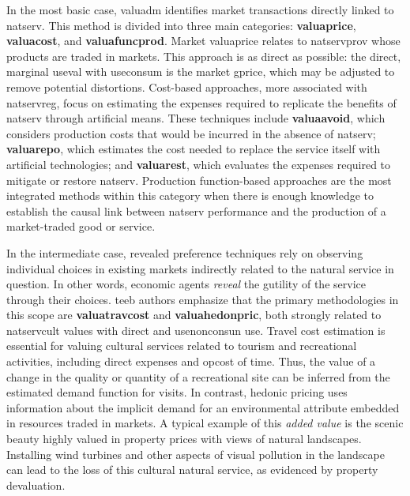 \documentclass[./main_en.tex]{subfiles}
\begin{document}
\par In the most basic case, \gls{valuadm} identifies market transactions directly linked to \gls{natserv}. This method is divided into three main categories: \textbf{\gls{valuaprice}}, \textbf{\gls{valuacost}}, and \textbf{\gls{valuafuncprod}}. Market \gls{valuaprice} relates to \gls{natservprov} whose products are traded in markets. This approach is as direct as possible: the direct, marginal \gls{useval} with \gls{useconsum} is the market \gls{gprice}, which may be adjusted to remove potential distortions. Cost-based approaches, more associated with \gls{natservreg}, focus on estimating the expenses required to replicate the benefits of \gls{natserv} through artificial means. These techniques include \textbf{\gls{valuaavoid}}, which considers production costs that would be incurred in the absence of \gls{natserv}; \textbf{\gls{valuarepo}}, which estimates the cost needed to replace the service itself with artificial technologies; and \textbf{\gls{valuarest}}, which evaluates the expenses required to mitigate or restore \gls{natserv}. Production function-based approaches are the most integrated methods within this category when there is enough knowledge to establish the causal link between \gls{natserv} performance and the production of a market-traded good or service.

\par In the intermediate case, revealed preference techniques rely on observing individual choices in existing markets indirectly related to the natural service in question. In other words, economic agents \textit{reveal} the \gls{gutility} of the service through their choices. \acrshort{teeb} authors emphasize that the primary methodologies in this scope are \textbf{\gls{valuatravcost}} and \textbf{\gls{valuahedonpric}}, both strongly related to \gls{natservcult} values with direct and \gls{usenonconsun} use. Travel cost estimation is essential for valuing cultural services related to tourism and recreational activities, including direct expenses and \gls{opcost} of time. Thus, the value of a change in the quality or quantity of a recreational site can be inferred from the estimated demand function for visits. In contrast, hedonic pricing uses information about the implicit demand for an environmental attribute embedded in resources traded in markets. A typical example of this \textit{added value} is the scenic beauty highly valued in property prices with views of natural landscapes. Installing wind turbines and other aspects of visual pollution in the landscape can lead to the loss of this cultural natural service, as evidenced by property devaluation.
\end{document}
